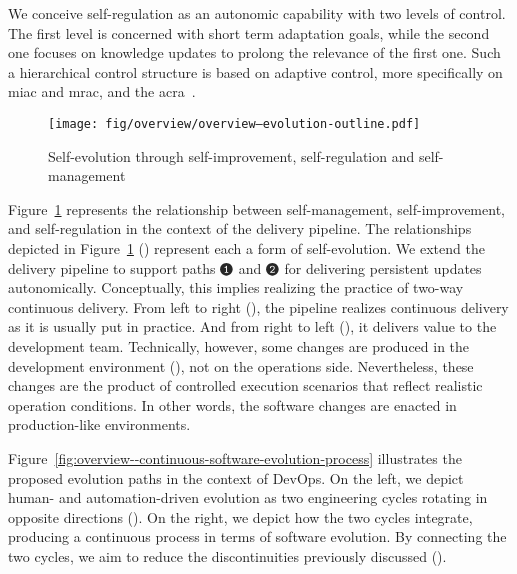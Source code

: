 We conceive self-regulation as an autonomic capability with two levels of control. The first level is concerned with short term adaptation goals, while the second one focuses on knowledge updates to prolong the relevance of the first one. Such a hierarchical control structure is based on adaptive control, more specifically on \gls{miac} and \gls{mrac}, and the \gls{acra}~\cite{ibm-2005-architectural}.

\begin{figure}[h]
	\centering
	\texttt{[image: fig/overview/overview--evolution-outline.pdf]}
	\caption{Self-evolution through self-improvement, self-regulation and self-management}
	\label{fig:overview--evolution-outline}
\end{figure}


Figure~\ref{fig:overview--evolution-outline} represents the relationship between self-management, self-improvement, and self-regulation in the context of the delivery pipeline. The relationships depicted in Figure~\ref{fig:overview--evolution-outline} () represent each a form of self-evolution. We extend the delivery pipeline to support paths $\encircleblack{1}$ and $\encircleblack{2}$ for delivering persistent updates autonomically. Conceptually, this implies realizing the practice of two-way continuous delivery. From left to right (), the pipeline realizes continuous delivery as it is usually put in practice. And from right to left (), it delivers value to the development team. Technically, however, some changes are produced in the development environment (), not on the operations side. Nevertheless, these changes are the product of controlled execution scenarios that reflect realistic operation conditions. In other words, the software changes are enacted in production-like environments.

Figure~\ref{fig:overview--continuous-software-evolution-process} illustrates the proposed evolution paths in the context of DevOps. On the left, we depict human- and automation-driven evolution as two engineering cycles rotating in opposite directions (). On the right, we depict how the two cycles integrate, producing a continuous process in terms of software evolution. By connecting the two cycles, we aim to reduce the discontinuities previously discussed ().

